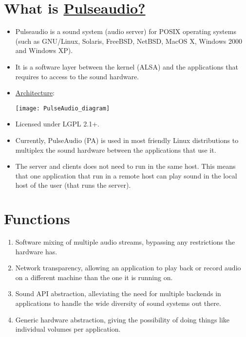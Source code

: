 \section{What is \href{http://www.freedesktop.org/wiki/Software/PulseAudio/About/}{Pulseaudio?}}

\begin{itemize}
\item Pulseaudio is a sound system (audio server) for POSIX operating
  systems (such as GNU/Linux, Solaris, FreeBSD, NetBSD, MacOS X,
  Windows 2000 and Windows XP).

\item It is a software layer between the kernel (ALSA) and the
  applications that requires to access to the sound hardware.

\item \href{https://rudd-o.com/linux-and-free-software/how-pulseaudio-works}{Architecture}:
\begin{center}
  \texttt{[image: PulseAudio\_diagram]}
\end{center}

\item Licensed under LGPL 2.1+.

\item Currently, PulseAudio (PA) is used in most friendly Linux
  distributions to multiplex the sound hardware between the
  applications that use it.

\item The server and clients does not need to run in the same
  host. This means that one application that run in a remote host can
  play sound in the local host of the user (that runs the server).

\end{itemize}

\section{Functions}
\begin{enumerate}
\item Software mixing of multiple audio streams, bypassing any
  restrictions the hardware has.
\item Network transparency, allowing an application to play back or
  record audio on a different machine than the one it is running on.
\item Sound API abstraction, alleviating the need for multiple
  backends in applications to handle the wide diversity of sound
  systems out there.
\item Generic hardware abstraction, giving the possibility of doing
  things like individual volumes per application.
\end{enumerate}

